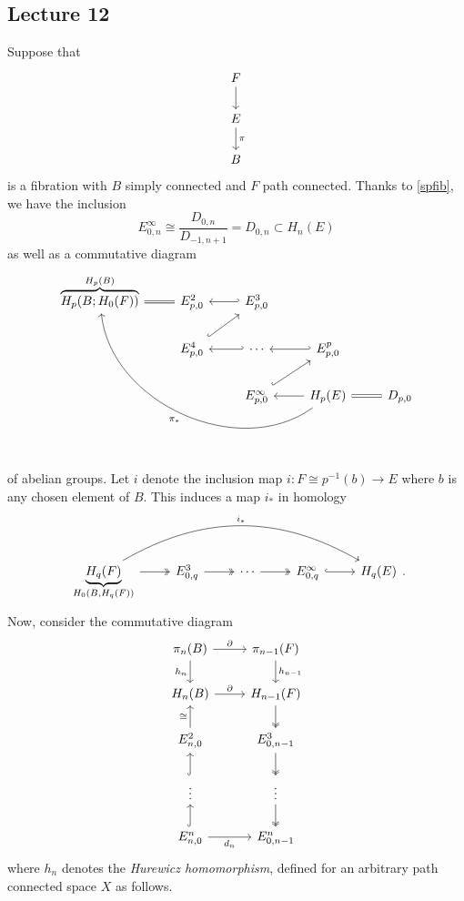 \documentclass[10pt,letterpaper,cm]{nupset}
\theoremstyle{definition}
\theoremstyle{theorem}
\theoremstyle{remark}
\newcommand{\1}{\mathbb{1}}
\newcommand{\0}{\vec 0}
\begin{document}
\subsection{Lecture 12}
Suppose that
\[
\begin{tikzcd}
F \arrow[d]        \\
E \arrow[d, "\pi"] \\
B                 
\end{tikzcd}
\]
is a fibration with $B$ simply connected and $F$ path connected. Thanks to \cref{spfib}, we have the inclusion $$E_{0,n}^{\infty} \cong \frac{D_{0,n}}{D_{{-1}, n+1}} =D_{0,n}  \subset H_n(E)$$ as well as a commutative diagram
\[
\begin{tikzcd}
\overbrace{H_p(B; H_0(F))}^{H_p(B)} \arrow[r, equals] & {E_{p,0}^2}                  & {E_{p,0}^3} \arrow[l, hook']        &                                                                      &           \\
                                              & {E_{p,0}^4} \arrow[ru, hook] & \cdots \arrow[l, hook']             & {E_{p,0}^p} \arrow[l, hook']                                         &           \\
                                              &                              & {E_{p,0}^{\infty}} \arrow[ru, hook] & H_p(E) \arrow[l] \arrow[r, equals] \arrow[llluu, "\pi_{\ast}", bend left=60] & {D_{p,0}}
\end{tikzcd}
\] of abelian groups.
Let $i$ denote the inclusion map $i : F \cong p^{-1}(b) \to E$ where $b$ is any chosen element of $B$. This induces a map $i_{\ast}$ in homology 
\[
\begin{tikzcd}
{\underbrace{H_q(F)}_{H_0(B, H_q(F))}} \arrow[r, two heads] \arrow[rrrr, "i_{\ast}", bend left] & {E^3_{0,q}} \arrow[r, two heads] & \cdots \arrow[r, two heads] & {E_{0,q}^{\infty}} \arrow[r, hook] & H_q(E)
\end{tikzcd}.
\]
Now, consider the commutative diagram
\[
\begin{tikzcd}
\pi_n(B) \arrow[d, "h_n"'] \arrow[r, "\partial"] & \pi_{n-1}(F) \arrow[d, "h_{n-1}"]  \\
H_n(B) \arrow[r, "\partial"]                     & H_{n-1}(F) \arrow[d, two heads]    \\
{E_{n,0}^2} \arrow[u, "\cong"]                   & {E_{0,n-1}^3} \arrow[d, two heads] \\
\vdots \arrow[u, hook]                           & \vdots \arrow[d, two heads]        \\
{E^n_{n,0}} \arrow[r, "d_n"'] \arrow[u, hook]    & {E_{0,n-1}^{n}}                   
\end{tikzcd}
\] where $h_n$ denotes the \textit{Hurewicz homomorphism}, defined for an arbitrary path connected space $X$ as follows. 
\end{document}
